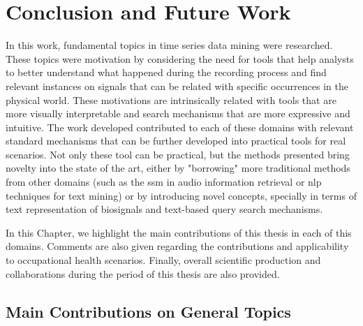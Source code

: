 
%

\chapter{Conclusion and Future Work}
\label{cha:Conclusion}

In this work, fundamental topics in time series data mining were researched. These topics were motivation by considering the need for tools that help analysts to better understand what happened during the recording process and find relevant instances on signals that can be related with specific occurrences in the physical world. These motivations are intrinsically related with tools that are more visually interpretable and search mechanisms that are more expressive and intuitive. The work developed contributed to each of these domains with relevant standard mechanisms that can be further developed into practical tools for real scenarios. Not only these tool can be practical, but the methods presented bring novelty into the state of the art, either by "borrowing" more traditional methods from other domains (such as the \gls{ssm} in audio information retrieval or \gls{nlp} techniques for text mining) or by introducing novel concepts, specially in terms of text representation of biosignals and text-based query search mechanisms.
\par
In this Chapter, we highlight the main contributions of this thesis in each of this domains. Comments are also given regarding the contributions and applicability to occupational health scenarios. Finally, overall scientific production and collaborations during the period of this thesis are also provided. 

\section{Main Contributions on General Topics}

